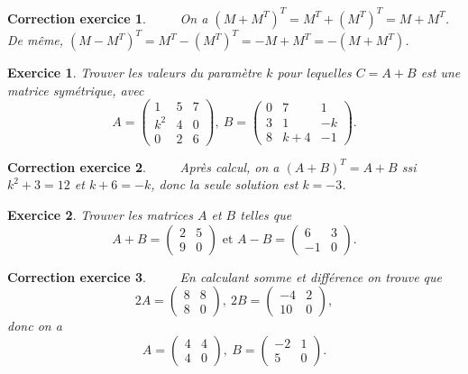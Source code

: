 \documentclass[12pt]{article}
\newtheorem{exercice}{\bf Exercice}
\newtheorem{correction}{\bf Correction exercice}
\newenvironment{exo}{
\begin{exercice}\smallskip\normalfont}{\end{exercice}
}
\newenvironment{cor}{
\begin{correction}\smallskip\normalfont}{\end{correction}
}
\newif\ifcorrige\corrigetrue
\begin{document}
\ifcorrige
\color{magenta}
\begin{cor}
  $\qquad$ On a $(M+M^T)^T=M^T+(M^T)^T=M+M^T$. De m\^eme, $(M-M^T)^T=M^T-(M^T)^T=-M+M^T=-(M+M^T)$.
\end{cor}
\color{black}
\fi

\begin{exo}
Trouver les valeurs du param\`etre $k$ pour lequelles $C=A+B$ est une matrice sym\'etrique, avec
$$A= \left ( \begin{array}{ccc} 1&5&7\\k^2&4&0\\0&2&6  \end{array}     \right),\ B= \left ( \begin{array}{ccc} 0&7&1\\3&1&-k\\8&k+4&-1  \end{array}     \right).$$
\end{exo}
\ifcorrige
\color{magenta}
\begin{cor}
  $\qquad$ Apr\`es calcul, on a $(A+B)^T=A+B$ ssi $k^2+3=12$ et $k+6=-k$, donc la seule solution est $k=-3$.
\end{cor}
\color{black}
\fi
\begin{exo}
 Trouver les matrices $A$ et $B$ telles que
 $$A+B=\left ( \begin{array}{cc} 2&5\\9&0    \end{array}     \right) \text{  et  }
 A-B=\left ( \begin{array}{cc} 6&3\\-1&0    \end{array}     \right).$$
\end{exo}
\ifcorrige
\color{magenta}
\begin{cor}
  $\qquad$ En calculant somme et diff\'erence on trouve que
  $$2A=\left ( \begin{array}{cc} 8&8\\8&0    \end{array}     \right),\ 2B=\left ( \begin{array}{cc} -4&2\\10&0    \end{array}     \right),$$
  donc on a
  $$A=\left ( \begin{array}{cc} 4&4\\4&0    \end{array}     \right),\ B=\left ( \begin{array}{cc} -2&1\\5&0    \end{array}     \right).$$
  \end{cor}
\end{document}
